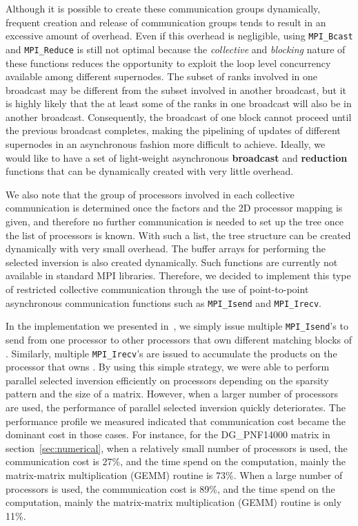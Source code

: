 \documentclass{acm_proc_article-sp}
\begin{document}
Although it is possible to create these communication groups
dynamically, frequent creation and release of communication
groups tends to result in an excessive amount of overhead. 
Even if this overhead is negligible, using \texttt{MPI\_Bcast}
and \texttt{MPI\_Reduce} is still not optimal because the
{\em collective} and {\em blocking} nature of these functions
reduces the opportunity to exploit the loop level concurrency
available among different supernodes. The subset of ranks involved
in one broadcast may be different from the subset involved in another
broadcast, but it is highly likely that the at least some of the ranks
in one broadcast will also be in another broadcast. Consequently,
the broadcast of one block cannot proceed until the previous
broadcast completes, making the pipelining of updates of different
supernodes in an asynchronous fashion more difficult to achieve. 
Ideally, we would like to have a set of light-weight asynchronous 
\textbf{broadcast} and \textbf{reduction} functions that can
be dynamically created with very little overhead.

We also note that the group of processors involved in each collective
communication is determined once the  factors and the 2D processor
mapping is given, and therefore no further communication is needed to
set up the tree once the list of processors is known. With such a list,
the tree structure can be created dynamically with very small overhead.
The buffer arrays for performing the selected inversion is also created
dynamically. Such functions are currently not available in standard MPI 
libraries. Therefore, we decided to implement this type of 
restricted collective communication through the use of
point-to-point asynchronous communication functions such
as \texttt{MPI\_Isend} and \texttt{MPI\_Irecv}. 

In the implementation we presented in~\cite{JacquelinLinYang2014},
we simply issue multiple \texttt{MPI\_Isend}'s to send 
 from one processor to other processors 
that own different matching blocks of . 
Similarly, multiple \texttt{MPI\_Irecv}'s are issued to accumulate 
the products  on the
processor that owns .
By using this simple strategy, we were able to perform 
parallel selected inversion efficiently on  processors 
depending on the sparsity pattern and the size of a matrix. 
However, when a larger number of processors are used, the performance
of parallel selected inversion quickly deteriorates.  The
performance profile we measured indicated that
communication cost became the dominant cost in those cases.
For instance, for the DG\_PNF14000 matrix in section~\ref{sec:numerical}, 
when a relatively small number of processors  is used, the communication
cost is 27\%, and the time spend on the computation, mainly the
matrix-matrix multiplication (GEMM) routine is 73\%. When a large
number of processors  is used, the communication
cost is 89\%, and the time spend on the computation, mainly the
matrix-matrix multiplication (GEMM) routine is only 11\%.
\end{document}
